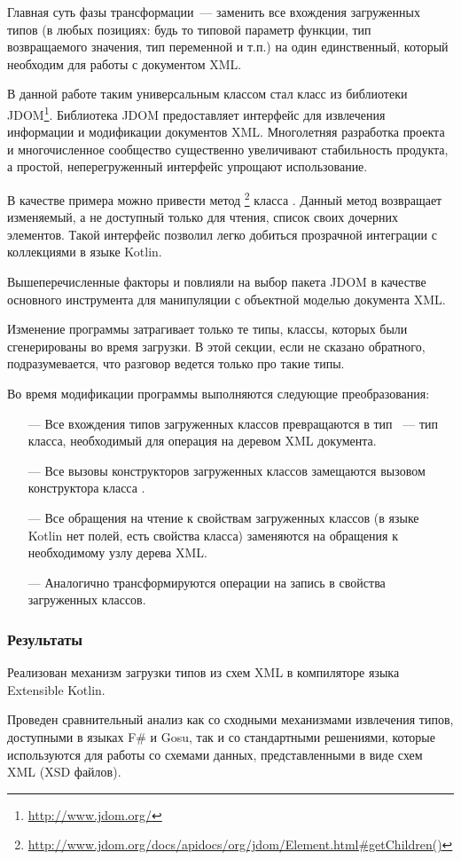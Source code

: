Главная суть фазы трансформации~--- заменить все вхождения загруженных типов (в любых позициях: будь то типовой параметр функции, тип возвращаемого значения, тип переменной и т.п.) на один единственный, который необходим для работы с документом XML.

В данной работе таким универсальным классом стал класс  из библиотеки JDOM\footnote{\url{http://www.jdom.org/}}. Библиотека JDOM предоставляет интерфейс для извлечения информации и модификации документов XML. Многолетняя разработка проекта и многочисленное сообщество существенно увеличивают стабильность продукта, а простой, неперегруженный интерфейс упрощают использование.

В качестве примера можно привести метод \footnote{\url{http://www.jdom.org/docs/apidocs/org/jdom/Element.html\#getChildren()}} класса .
Данный метод возвращает изменяемый, а не доступный только для чтения, список своих дочерних элементов. Такой интерфейс позволил легко добиться прозрачной интеграции с коллекциями в языке Kotlin.

Вышеперечисленные факторы и повлияли на выбор пакета JDOM в качестве основного инструмента для манипуляции с объектной моделью документа XML.

Изменение программы затрагивает только те типы, классы, которых были сгенерированы во время загрузки. В этой секции, если не сказано обратного, подразумевается, что разговор ведется только про такие типы.

Во время модификации программы выполняются следующие преобразования:
\begin{itemize}
\item[---] Все вхождения типов загруженных классов превращаются в тип ~--- тип класса, необходимый для операция на деревом XML документа.
\item[---] Все вызовы конструкторов загруженных классов замещаются вызовом конструктора класса .
\item[---] Все обращения на чтение к свойствам загруженных классов (в языке Kotlin нет полей, есть свойства класса) заменяются на обращения к необходимому узлу дерева XML.
\item[---] Аналогично трансформируются операции на запись в свойства загруженных классов.
\end{itemize}

\subsubsection{Результаты}
Реализован механизм загрузки типов из схем XML в компиляторе языка Extensible Kotlin.

Проведен сравнительный анализ как со сходными механизмами извлечения типов, доступными в языках F\# и Gosu, так и со стандартными решениями, которые используются для работы со схемами данных, представленными в виде схем XML (XSD файлов).